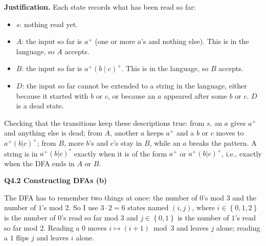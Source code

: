 \documentclass[11pt]{article}
\newcommand{\set}[1]{\left\{#1\right\}}
\newcommand{\qpage}[1]{\clearpage\noindent\textbf{\large #1}\par\medskip}
\begin{document}
\textbf{Justification.}
Each state records what has been read so far:
\begin{itemize}
  \item $s$: nothing read yet.
  \item $A$: the input so far is $a^+$ (one or more $a$'s and nothing else). This is in the language, so $A$ accepts.
  \item $B$: the input so far is $a^+ (b \mid c)^+$. This is in the language, so $B$ accepts.
  \item $D$: the input so far cannot be extended to a string in the language, either because it started with $b$ or $c$, or because an $a$ appeared after some $b$ or $c$. $D$ is a dead state.
\end{itemize}
Checking that the transitions keep these descriptions true: from $s$, an $a$ gives $a^+$ and anything else is dead; from $A$, another $a$ keeps $a^+$ and a $b$ or $c$ moves to $a^+(b|c)^+$; from $B$, more $b$'s and $c$'s stay in $B$, while an $a$ breaks the pattern.
A string is in $a^+(b|c)^*$ exactly when it is of the form $a^+$ or $a^+(b|c)^+$, i.e., exactly when the DFA ends in $A$ or $B$.

\qpage{Q4.2 Constructing DFAs (b)}

The DFA has to remember two things at once: the number of $0$'s mod $3$ and the number of $1$'s mod $2$.
So I use $3 \cdot 2 = 6$ states named $(i,j)$, where $i \in \set{0,1,2}$ is the number of $0$'s read so far mod $3$ and $j \in \set{0,1}$ is the number of $1$'s read so far mod $2$.
Reading a $0$ moves $i \mapsto (i+1) \bmod 3$ and leaves $j$ alone; reading a $1$ flips $j$ and leaves $i$ alone.

\begin{center}
\end{center}
\end{document}
